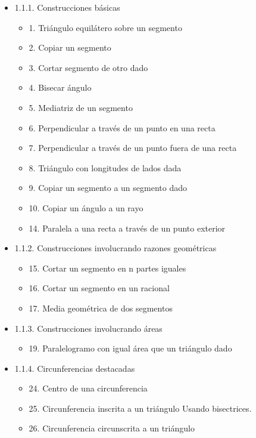 \documentclass[11pt]{article}
\begin{document}
\begin{itemize}
\item 1.1.1. Construcciones básicas
\label{sec-5-1-1-2}
\begin{itemize}
\item 1. Triángulo equilátero sobre un segmento
\label{sec-5-1-1-2-1}
\item 2. Copiar un segmento
\label{sec-5-1-1-2-2}
\item 3. Cortar segmento de otro dado
\label{sec-5-1-1-2-3}
\item 4. Bisecar ángulo
\label{sec-5-1-1-2-4}
\item 5. Mediatriz de un segmento
\label{sec-5-1-1-2-5}
\item 6. Perpendicular a través de un punto en una recta
\label{sec-5-1-1-2-6}
\item 7. Perpendicular a través de un punto fuera de una recta
\label{sec-5-1-1-2-7}
\item 8. Triángulo con longitudes de lados dada
\label{sec-5-1-1-2-8}
\item 9. Copiar un segmento a un segmento dado
\label{sec-5-1-1-2-9}
\item 10. Copiar un ángulo a un rayo
\label{sec-5-1-1-2-10}
\item 14. Paralela a una recta a través de un punto exterior
\label{sec-5-1-1-2-11}
\end{itemize}
\item 1.1.2. Construcciones involucrando razones geométricas
\label{sec-5-1-1-3}
\begin{itemize}
\item 15. Cortar un segmento en n partes iguales
\label{sec-5-1-1-3-1}
\item 16. Cortar un segmento en un racional
\label{sec-5-1-1-3-2}
\item 17. Media geométrica de dos segmentos
\label{sec-5-1-1-3-3}
\end{itemize}
\item 1.1.3. Construcciones involucrando áreas
\label{sec-5-1-1-4}
\begin{itemize}
\item 19. Paralelogramo con igual área que un triángulo dado
\label{sec-5-1-1-4-1}
\end{itemize}
\item 1.1.4. Circunferencias destacadas
\label{sec-5-1-1-5}
\begin{itemize}
\item 24. Centro de una circunferencia
\label{sec-5-1-1-5-1}
\item 25. Circunferencia inscrita a un triángulo
\label{sec-5-1-1-5-2}
Usando bisectrices.
\item 26. Circunferencia circunscrita a un triángulo
\label{sec-5-1-1-5-3}
\end{itemize}
\end{itemize}
\end{document}
